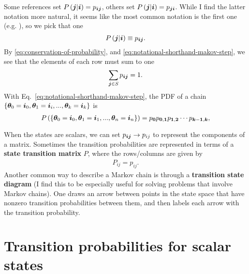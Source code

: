 Some references set $P\left({\bm j}|{\bm i}\right) = p_{{\bm i}{\bm j}}$, others set $P\left({\bm j}|{\bm i}\right) = p_{{\bm j}{\bm i}}$.
While I find the latter notation more natural, it seems like the most common notation is the first one (e.g. \cite{wasserman2010statistics,pishro2014introduction}), so we pick that one
\begin{align}
    \label{eq:notational-shorthand-makov-step}
    P\left({\bm j}|{\bm i}\right)
    \equiv
    p_{{\bm i}{\bm j}}
    .
\end{align}
By \eqref{eq:conservation-of-probability}, and \eqref{eq:notational-shorthand-makov-step}, we see that the elements of each row must sum to one
\begin{align}
    \label{eq:rows-sum-to-one}
    \sum_{{\bm j}\in S} p_{{\bm i}{\bm j}}
    =
    1
    .
\end{align}
With Eq.~\eqref{eq:notational-shorthand-makov-step}, the PDF of a chain $\left\{{\bm \theta}_0={\bm i}_0, {\bm \theta}_1={\bm i}_i, ... , {\bm \theta}_k={\bm i}_k\right\}$ is
\begin{align}
    P\left(\left\{{\bm \theta}_0={\bm i}_0, {\bm \theta}_1={\bm i}_1, ... , {\bm \theta}_n={\bm i}_n\right\}\right)
    =
    p_{{\bm 0}} p_{{\bm 0},{\bm 1}} p_{{\bm 1},{\bm 2}} \cdots p_{{\bm k}-{\bm 1},{\bm k}}
    ,
\end{align}

When the states are scalars, we can set $p_{{\bm i} {\bm j}} \to p_{ij}$ to represent the components of a matrix. 
Sometimes the transition probabilities are represented in terms of a \textbf{state transition matrix} $P$, where the rows/columns are given by
\begin{align}
    P_{ij}
    =
    p_{ij}
    .
\end{align}
Another common way to describe a Markov chain is through a \textbf{transition state diagram} (I find this to be especially useful for solving problems that involve Markov chains).
One draws an arrow between points in the state space that have nonzero transition probabilities between them, and then labels each arrow with the transition probability.

\section{Transition probabilities for scalar states\label{sec:transition-probabilities}}

